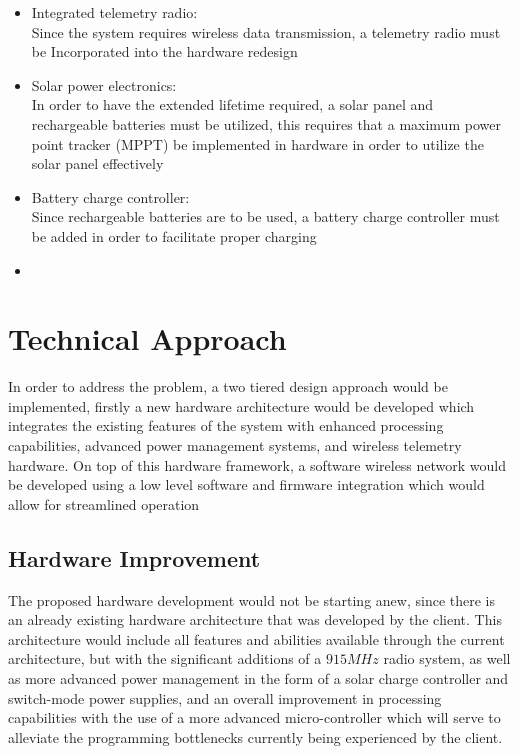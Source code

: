 \documentclass[12pt]{article}
\begin{document}
\begin{itemize}
\item Integrated telemetry radio: \\
{\small  Since the system requires wireless data transmission, a telemetry radio must be Incorporated into the hardware redesign}
\item Solar power electronics: \\
{\small In order to have the extended lifetime required, a solar panel and rechargeable batteries must be utilized, this requires that a maximum power point tracker (MPPT) be implemented in hardware in order to utilize the solar panel effectively}
\item Battery charge controller: \\
{\small Since rechargeable batteries are to be used, a battery charge controller must be added in order to facilitate proper charging}
\item %
\end{itemize}

\section{Technical Approach}
In order to address the problem, a two tiered design approach would be implemented, firstly a new hardware architecture would be developed which integrates the existing features of the system with enhanced processing capabilities, advanced power management systems, and wireless telemetry hardware. On top of this hardware framework, a software wireless network would be developed using a low level software and firmware integration which would allow for streamlined operation %
\subsection{Hardware Improvement}
The proposed hardware development would not be starting anew, since there is an already existing hardware architecture that was developed by the client. This architecture would include all features and abilities available through the current architecture, but with the significant additions of a $915 MHz$ radio system, as well as more advanced power management in the form of a solar charge controller and switch-mode power supplies, and an overall improvement in processing capabilities with the use of a more advanced micro-controller which will serve to alleviate the programming bottlenecks currently being experienced by the client. %
\end{document}
